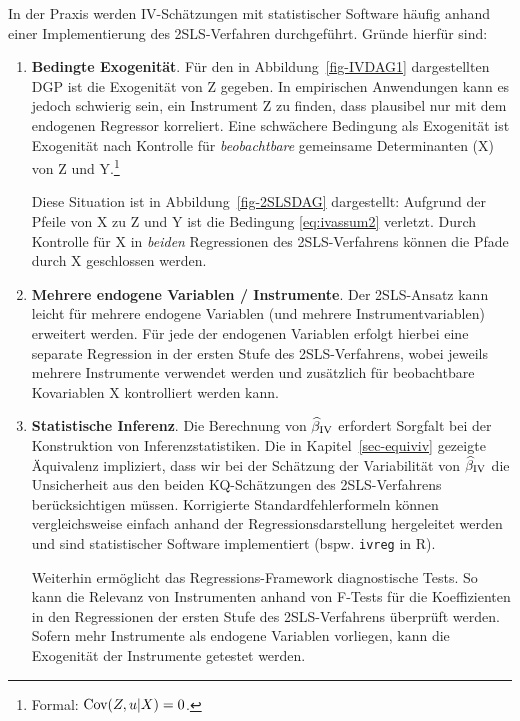 \documentclass[
  a4paper,
  DIV=11,
  oneside]{scrreprt}
\begin{document}
In der Praxis werden IV-Schätzungen mit statistischer Software häufig
anhand einer Implementierung des 2SLS-Verfahren durchgeführt. Gründe
hierfür sind:

\begin{enumerate}
\def\labelenumi{\arabic{enumi}.}
\item
  \textbf{Bedingte Exogenität}. Für den in Abbildung~\ref{fig-IVDAG1}
  dargestellten DGP ist die Exogenität von Z gegeben. In empirischen
  Anwendungen kann es jedoch schwierig sein, ein Instrument Z zu finden,
  dass plausibel nur mit dem endogenen Regressor korreliert. Eine
  schwächere Bedingung als Exogenität ist Exogenität nach Kontrolle für
  \emph{beobachtbare} gemeinsame Determinanten (X) von Z und
  Y.\footnote{Formal: \(\textup{Cov}(Z,u\vert X) = 0\).}

  Diese Situation ist in Abbildung~\ref{fig-2SLSDAG} dargestellt:
  Aufgrund der Pfeile von X zu Z und Y ist die Bedingung
  \eqref{eq:ivassum2} verletzt. Durch Kontrolle für X in \emph{beiden}
  Regressionen des 2SLS-Verfahrens können die Pfade durch X geschlossen
  werden.
\item
  \textbf{Mehrere endogene Variablen / Instrumente}. Der 2SLS-Ansatz
  kann leicht für mehrere endogene Variablen (und mehrere
  Instrumentvariablen) erweitert werden. Für jede der endogenen
  Variablen erfolgt hierbei eine separate Regression in der ersten Stufe
  des 2SLS-Verfahrens, wobei jeweils mehrere Instrumente verwendet
  werden und zusätzlich für beobachtbare Kovariablen X kontrolliert
  werden kann.
\item
  \textbf{Statistische Inferenz}. Die Berechnung von
  \(\widehat{\beta}_\textup{IV}\) erfordert Sorgfalt bei der
  Konstruktion von Inferenzstatistiken. Die in Kapitel~\ref{sec-equiviv}
  gezeigte Äquivalenz impliziert, dass wir bei der Schätzung der
  Variabilität von \(\widehat{\beta}_\textup{IV}\) die Unsicherheit aus
  den beiden KQ-Schätzungen des 2SLS-Verfahrens berücksichtigen müssen.
  Korrigierte Standardfehlerformeln können vergleichsweise einfach
  anhand der Regressionsdarstellung hergeleitet werden und sind
  statistischer Software implementiert (bspw. \texttt{ivreg} in R).

  Weiterhin ermöglicht das Regressions-Framework diagnostische Tests. So
  kann die Relevanz von Instrumenten anhand von F-Tests für die
  Koeffizienten in den Regressionen der ersten Stufe des 2SLS-Verfahrens
  überprüft werden. Sofern mehr Instrumente als endogene Variablen
  vorliegen, kann die Exogenität der Instrumente getestet werden.
\end{enumerate}
\end{document}
